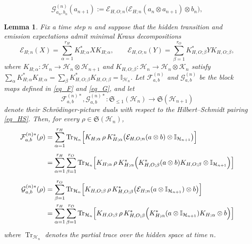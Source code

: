\documentclass[10pt,a4paper]{amsart}
\newtheorem{lemma}{Lemma}
\begin{document}
\begin{equation}\label{eq_G}
\mathcal{G}_{a_n,b_n}^{(n)}(a_{n+1})
:=
{\mathcal{E}}_{H,O;n}\bigl(\mathcal{E}_{H;n}(a_n\otimes a_{n+1})\otimes b_n\bigr),
\end{equation}

\begin{lemma}\label{lem:dual-block-maps} 
Fix a time step $n$ and suppose that the hidden transition and emission expectations admit minimal Kraus decompositions
\[
\mathcal{E}_{H;n}(X)
=
\sum_{\alpha=1}^{r_H} K_{H;\alpha}^{*} X K_{H;\alpha},
\qquad
\mathcal{E}_{H,O;n}(Y)
=
\sum_{\beta=1}^{r_O} K_{H,O;\beta}^{*} Y K_{H,O;\beta},
\]
where $K_{H;\alpha}:\mathcal{H}_n\to\mathcal{H}_n\otimes\mathcal{H}_{n+1}$ and $K_{H,O;\beta}:\mathcal{H}_n\to\mathcal{H}_n\otimes\mathcal{K}_n$ satisfy
\(
\sum_{\alpha}K_{H;\alpha}^{*}K_{H;\alpha}
=
\sum_{\beta}K_{H,O;\beta}^{*}K_{H,O;\beta}
=
\mathbb{I}_{\mathcal{H}_n}
\).
Let $\mathcal{F}_{a,b}^{(n)}$ and $\mathcal{G}_{a,b}^{(n)}$ be the block maps defined in \eqref{eq_F} and \eqref{eq_G}, and let
\[
\mathcal{F}_{a,b}^{(n)*},\mathcal{G}_{a,b}^{(n)*}:\mathfrak{S}_{\le 1}(\mathcal{H}_n)\to\mathfrak{S}(\mathcal{H}_{n+1})
\]
denote their Schr\"odinger-picture duals with respect to the Hilbert–Schmidt pairing \eqref{eq_HS}. Then, for every $\rho\in\mathfrak{S}(\mathcal{H}_n)$,
\begin{align} \label{Fab*}
\mathcal{F}_{a,b}^{(n)*}(\rho)
&=
\sum_{\alpha=1}^{r_H}
\operatorname{Tr}_{\mathcal{H}_n}\Bigl[
K_{H;\alpha}\,\rho\,K_{H;\alpha}^{*}
\bigl(\mathcal{E}_{H,O;n}(a\otimes b)\otimes\mathbb{I}_{\mathcal{H}_{n+1}}\bigr)
\Bigr]\nonumber\\[0.4em]
&=
\sum_{\alpha=1}^{r_H}\sum_{\beta=1}^{r_O}
\operatorname{Tr}_{\mathcal{H}_n}\Bigl[
K_{H;\alpha}\,\rho\,K_{H;\alpha}^{*}
\Bigl(
 K_{H,O;\beta}^{*}(a\otimes b)K_{H,O;\beta}
\otimes\mathbb{I}_{\mathcal{H}_{n+1}}
\Bigr)
\Bigr]\\[0.4em]
\label{Gab*}\mathcal{G}_{a,b}^{(n)*}(\rho)
&=
\sum_{\beta=1}^{r_O}
\operatorname{Tr}_{\mathcal{H}_n}\Bigl[
K_{H,O;\beta}\,\rho\,K_{H,O;\beta}^{*}
\bigl(\mathcal{E}_{H;n}(a\otimes\mathbb{I}_{\mathcal{H}_{n+1}})\otimes b\bigr)
\Bigr]\nonumber\\
&=
\sum_{\alpha=1}^{r_H}\sum_{\beta=1}^{r_O}
\operatorname{Tr}_{\mathcal{H}_n}\Bigl[
K_{H,O;\beta}\,\rho\,K_{H,O;\beta}^{*}
\Bigl(
K_{H;\alpha}^{*}(a\otimes\mathbb{I}_{\mathcal{H}_{n+1}})K_{H;\alpha}
\otimes b
\Bigr)
\Bigr]
\end{align}
where $\operatorname{Tr}_{\mathcal{H}_n}$ denotes the partial trace over the hidden space at time $n$.
\end{lemma}
\end{document}
